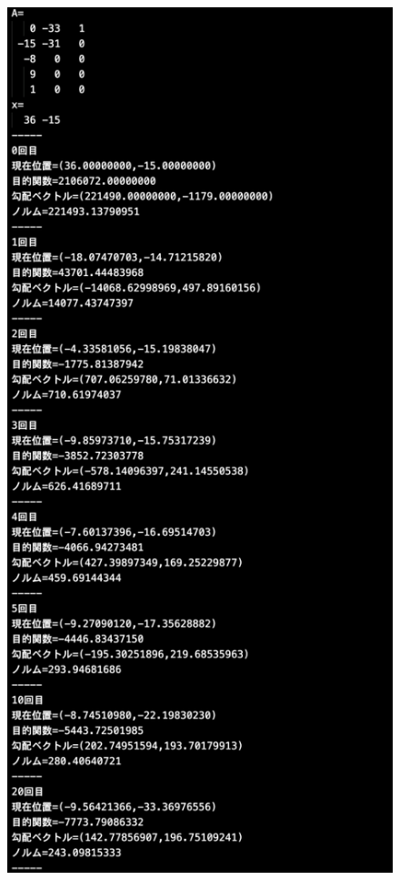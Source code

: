 \documentclass[12pt]{jarticle}
\begin{document}
\clearpage
\begin{figure}[h]
    \begin{center}
        \includegraphics[scale=0.2]{kadai1_2s_out2_2_1.png}
    \end{center}

\end{figure}
\end{document}
